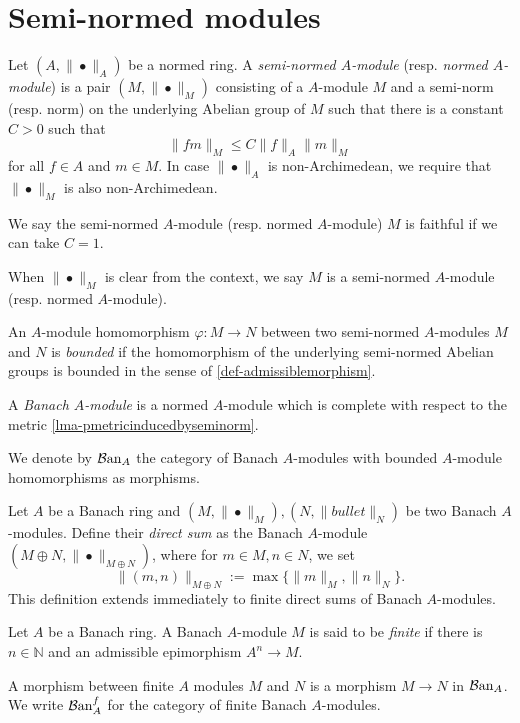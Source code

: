 \section{Semi-normed modules}

\begin{definition}
    Let $(A,\|\bullet\|_A)$ be a normed ring. A \emph{semi-normed $A$-module} (resp. \emph{normed $A$-module}) is a pair $(M,\|\bullet\|_M)$ consisting of a $A$-module $M$ and a semi-norm (resp. norm) on the underlying Abelian group of $M$ such that there is a constant $C>0$ such that
    \[
      \|fm\|_M \leq C \|f\|_A \|m\|_M
    \]
    for all $f\in A$ and $m\in M$. In case $\|\bullet\|_A$ is non-Archimedean, we require that $\|\bullet\|_M$ is also non-Archimedean. 

    We say the semi-normed $A$-module (resp. normed $A$-module) $M$ is faithful if we can take $C=1$.

    When $\|\bullet\|_M$ is clear from the context, we say $M$ is a semi-normed $A$-module (resp. normed $A$-module).

    An $A$-module homomorphism $\varphi:M\rightarrow N$ between two semi-normed $A$-modules $M$ and $N$ is \emph{bounded} if the homomorphism of the underlying semi-normed Abelian groups is bounded in the sense of \cref{def-admissiblemorphism}.

    A \emph{Banach $A$-module} is a normed $A$-module which is complete with respect to the metric \cref{lma-pmetricinducedbyseminorm}.

    We denote by $\mathcal{B}\mathrm{an}_A$ the category of Banach $A$-modules with bounded $A$-module homomorphisms as morphisms.
\end{definition}

\begin{definition}
    Let $A$ be a Banach ring and $(M,\|\bullet\|_M),(N,\|bullet\|_N)$ be two Banach $A$-modules. Define their \emph{direct sum} as the Banach $A$-module $(M\oplus N, \|\bullet\|_{M\oplus N})$, where for $m\in M, n\in N$, we set
    \[
        \|(m,n)\|_{M\oplus N}:=\max\{\|m\|_M,\|n\|_N \}.  
    \]
    This definition extends immediately to finite direct sums of Banach $A$-modules.
\end{definition}

\begin{definition}\label{def-finiteBanachmodules}
    Let $A$ be a Banach ring. A Banach $A$-module $M$ is said to be \emph{finite} if there is $n\in \mathbb{N}$ and an admissible epimorphism $A^n\rightarrow M$. 

    A morphism between finite $A$ modules $M$ and $N$  is a morphism $M\rightarrow N$ in $\mathcal{B}\mathrm{an}_A$. We write $\mathcal{B}\mathrm{an}_A^f$ for the category of finite Banach $A$-modules.
\end{definition}

